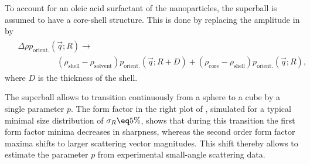 \documentclass[\main/dresen_thesis.tex]{subfiles}
\begin{document}
    To account for an oleic acid surfactant of the nanoparticles, the superball is assumed to have a core-shell structure.
    This is done by replacing the amplitude in  by
    \begin{align}
      \begin{split}
        &\Delta \rho p_\mathrm{orient.}(\vec{q}; R) \rightarrow\\
        &\hspace{2cm}(\rho_\mathrm{shell} - \rho_\mathrm{solvent}) p_\mathrm{orient.}(\vec{q}; R+D) + (\rho_\mathrm{core} - \rho_\mathrm{shell}) p_\mathrm{orient.}(\vec{q}; R),
      \end{split}
    \end{align}
    where $D$ is the thickness of the shell.

    The superball allows to transition continuously from a sphere to a cube by a single parameter $p$.
    The form factor in the right plot of , simulated for a typical minimal size distribution of $\sigma_R \eq 5 \%$, shows that during this transition the first form factor minima decreases in sharpness, whereas the second order form factor maxima shifts to larger scattering vector magnitudes.
    This shift thereby allows to estimate the parameter $p$ from experimental small-angle scattering data.
\end{document}
